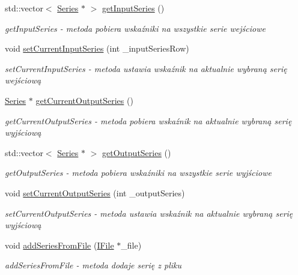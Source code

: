 \begin{DoxyCompactItemize}
std\+::vector$<$ \hyperlink{class_series}{Series} $\ast$ $>$ \hyperlink{class_data_manager_afb4de666c7412d0d1892e7e54ed82aaf}{get\+Input\+Series} ()
\begin{DoxyCompactList}\small\item\em get\+Input\+Series -\/ metoda pobiera wskaźniki na wszystkie serie wejściowe \end{DoxyCompactList}\item 
void \hyperlink{class_data_manager_a2c9efa56273db676e98641c1d84bbee2}{set\+Current\+Input\+Series} (int \+\_\+input\+Series\+Row)
\begin{DoxyCompactList}\small\item\em set\+Current\+Input\+Series -\/ metoda ustawia wskaźnik na aktualnie wybraną serię wejściową \end{DoxyCompactList}\item 
\hyperlink{class_series}{Series} $\ast$ \hyperlink{class_data_manager_a86ad97b64097b93db9f8cd02a73c801c}{get\+Current\+Output\+Series} ()
\begin{DoxyCompactList}\small\item\em get\+Current\+Output\+Series -\/ metoda pobiera wskaźnik na aktualnie wybraną serię wyjściową \end{DoxyCompactList}\item 
std\+::vector$<$ \hyperlink{class_series}{Series} $\ast$ $>$ \hyperlink{class_data_manager_a36454e708a2041da015549ea38877a16}{get\+Output\+Series} ()
\begin{DoxyCompactList}\small\item\em get\+Output\+Series -\/ metoda pobiera wskaźniki na wszystkie serie wyjściowe \end{DoxyCompactList}\item 
void \hyperlink{class_data_manager_a18a047d7c27dac16ad97e0ab08ab1a11}{set\+Current\+Output\+Series} (int \+\_\+output\+Series)
\begin{DoxyCompactList}\small\item\em set\+Current\+Output\+Series -\/ metoda ustawia wskaźnik na aktualnie wybraną serię wyjściową \end{DoxyCompactList}\item 
void \hyperlink{class_data_manager_ac7adc63ceee86ef18b88408d536468fd}{add\+Series\+From\+File} (\hyperlink{class_i_file}{I\+File} $\ast$\+\_\+file)
\begin{DoxyCompactList}\small\item\em add\+Series\+From\+File -\/ metoda dodaje serię z pliku \end{DoxyCompactList}\item 

\end{DoxyCompactItemize}
